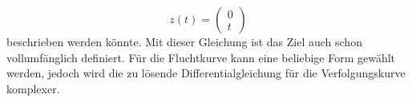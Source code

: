 \begin{equation}
    z(t)
    =
    \left( \begin{array}{c} 0 \\  t \end{array} \right)
\end{equation}
%
beschrieben werden könnte.
Mit dieser Gleichung ist das Ziel auch schon vollumfänglich definiert.
Für die Fluchtkurve kann eine beliebige Form gewählt werden, jedoch wird die zu lösende Differentialgleichung für die Verfolgungskurve komplexer.




